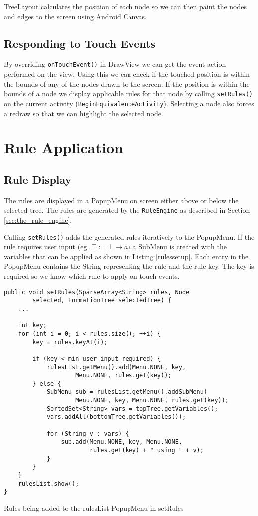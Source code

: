 \documentclass{report}
\begin{document}
TreeLayout calculates the position of each node so we can then paint the nodes and edges to the screen using Android Canvas.

\subsection{Responding to Touch Events}

By overriding {\tt onTouchEvent()} in DrawView we can get the event action performed on the view. Using this we can check if the touched position is within the bounds of any of the nodes drawn to the screen. If the position is within the bounds of a node we display applicable rules for that node by calling {\tt setRules()} on the current activity ({\tt BeginEquivalenceActivity}). Selecting a node also forces a redraw so that we can highlight the selected node.

\section{Rule Application}

\subsection{Rule Display}

The rules are displayed in a PopupMenu on screen either above or below the selected tree. The rules are generated by the {\tt RuleEngine} as described in Section \ref{sec:the_rule_engine}.

Calling {\tt setRules()} adds the generated rules iteratively to the PopupMenu. If the rule requires user input (eg. $\top := \bot \to a$) a SubMenu is created with the variables that can be applied as shown in Listing \ref{rulessetup}. Each entry in the PopupMenu contains the String representing the rule and the rule key. The key is required so we know which rule to apply on touch events.

\begin{listing}[ht]
\begin{verbatim}
public void setRules(SparseArray<String> rules, Node 
        selected, FormationTree selectedTree) {
    ...

    int key;
    for (int i = 0; i < rules.size(); ++i) {
        key = rules.keyAt(i);

        if (key < min_user_input_required) {
            rulesList.getMenu().add(Menu.NONE, key, 
                    Menu.NONE, rules.get(key));
        } else {
            SubMenu sub = rulesList.getMenu().addSubMenu(
                    Menu.NONE, key, Menu.NONE, rules.get(key));
            SortedSet<String> vars = topTree.getVariables();
            vars.addAll(bottomTree.getVariables());

            for (String v : vars) {
                sub.add(Menu.NONE, key, Menu.NONE, 
                        rules.get(key) + " using " + v);
            }
        }
    }
    rulesList.show();
}
\end{verbatim}
\caption{Rules being added to the rulesList PopupMenu in setRules}
\label{rulessetup}
\end{listing}
\end{document}
